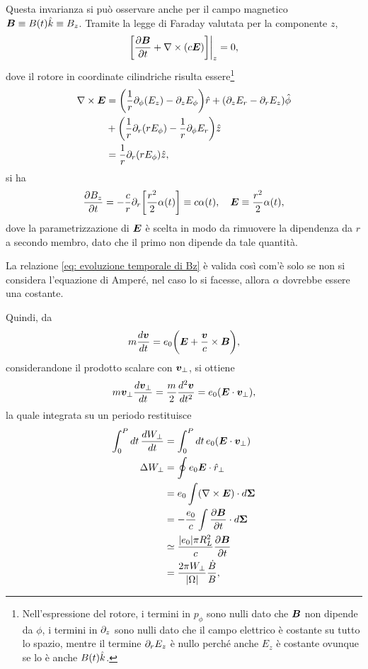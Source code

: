 Questa invarianza si può osservare anche per il campo magnetico $\bm{B} \equiv B(t)\hat{k} \equiv B_z$. Tramite la legge di Faraday valutata per la componente $z$,
\begin{equation}
    \bigg[\frac{\partial\bm{B}}{\partial t} + \nabla \times (c\bm{E})\bigg]\bigg|_z = 0,
\end{equation}
dove il rotore in coordinate cilindriche risulta essere\footnote{Nell'espressione del rotore, i termini in $p_\phi$ sono nulli dato che $\bm{B}$ non dipende da $\phi$, i termini in $\partial_z$ sono nulli dato che il campo elettrico è costante su tutto lo spazio, mentre il termine $\partial_rE_z$ è nullo perché anche $E_z$ è costante ovunque se lo è anche $B(t)\hat{k}$.}
\begin{equation}
    \begin{split}
        \nabla \times \bm{E} &= \bigg(\frac{1}{r}\partial_\phi(E_z) - \partial_zE_\phi\bigg)\hat{r} + (\partial_zE_r - \partial_rE_z)\hat{\phi} \\
        &+ \bigg(\frac{1}{r}\partial_r(rE_\phi) - \frac{1}{r}\partial_\phi E_r\bigg)\hat{z} \\
        &= \frac{1}{r}\partial_r(rE_\phi)\hat{z},
    \end{split}
\end{equation}
si ha 
\begin{equation}
\label{eq: evoluzione temporale di Bz}
    \frac{\partial B_z}{\partial t} = -\frac{c}{r}\partial_r\bigg[\frac{r^2}{2}\alpha(t)\bigg] \equiv c\alpha(t),\quad \bm{E} \equiv \frac{r^2}{2}\alpha(t),
\end{equation}
dove la parametrizzazione di $\bm{E}$ è scelta in modo da rimuovere la dipendenza da $r$ a secondo membro, dato che il primo non dipende da tale quantità.
\begin{obs}
    La relazione \eqref{eq: evoluzione temporale di Bz} è valida così com'è solo se non si considera l'equazione di Amperé, nel caso lo si facesse, allora $\alpha$ dovrebbe essere una costante.
\end{obs}
Quindi, da 
\begin{equation}
    m\frac{d\bm{v}}{dt} = e_0\bigg(\bm{E} + \frac{\bm{v}}{c}\times \bm{B}\bigg),
\end{equation}
considerandone il prodotto scalare con $\bm{v}_\perp$, si ottiene
\begin{equation}
    m\bm{v}_\perp\frac{d\bm{v}_\perp}{dt} = \frac{m}{2}\frac{d^2\bm{v}}{dt^2} = e_0(\bm{E} \cdot \bm{v}_\perp),
\end{equation}
la quale integrata su un periodo restituisce
\begin{equation}
    \begin{split}
        \int_0^Pdt\,\frac{dW_\perp}{dt} &= \int_0^Pdt\,e_0(\bm{E} \cdot \bm{v}_\perp) \\
        \Delta W_\perp &= \oint e_0\bm{E} \cdot \hat{r}_\perp \\
        &= e_0\int (\nabla \times \bm{E})\cdot d\bm{\Sigma} \\
        &= -\frac{e_0}{c}\int \frac{\partial\bm{B}}{\partial t}\cdot d\bm{\Sigma} \\
        &\simeq \frac{|e_0|\pi R_L^2}{c}\frac{\partial\bm{B}}{\partial t} \\
        &= \frac{2\pi W_\perp}{|\Omega|}\frac{\dot{B}}{B},
    \end{split}
\end{equation}
